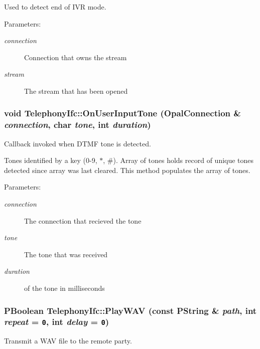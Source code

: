 Used to detect end of IVR mode. \begin{Desc}
\item[Parameters:]
\begin{description}
\item[{\em connection}]Connection that owns the stream \item[{\em stream}]The stream that has been opened \end{description}
\end{Desc}
\hypertarget{classTelephonyIfc_085ab0d59a990bda8b17cb56b1baaeb1}{
\subsubsection[{OnUserInputTone}]{\setlength{\rightskip}{0pt plus 5cm}void TelephonyIfc::OnUserInputTone (OpalConnection \& {\em connection}, \/  char {\em tone}, \/  int {\em duration})}}
\label{classTelephonyIfc_085ab0d59a990bda8b17cb56b1baaeb1}


Callback invoked when DTMF tone is detected. 

Tones identified by a key (0-9, $\ast$, \#). Array of tones holds record of unique tones detected since array was last cleared. This method populates the array of tones. \begin{Desc}
\item[Parameters:]
\begin{description}
\item[{\em connection}]The connection that recieved the tone \item[{\em tone}]The tone that was received \item[{\em duration}]of the tone in milliseconds \end{description}
\end{Desc}
\hypertarget{classTelephonyIfc_1138529389af3b4712bd11fadd4836ca}{
\subsubsection[{PlayWAV}]{\setlength{\rightskip}{0pt plus 5cm}PBoolean TelephonyIfc::PlayWAV (const PString \& {\em path}, \/  int {\em repeat} = {\tt 0}, \/  int {\em delay} = {\tt 0})}}
\label{classTelephonyIfc_1138529389af3b4712bd11fadd4836ca}


Transmit a WAV file to the remote party. 

